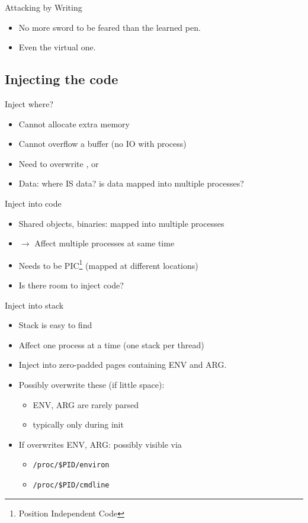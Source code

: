 \documentclass{beamer}
\newenvironment{itemizeframe}[1]
  {\begin{frame}{#1}\startitemizeframe}
  {\stopitemizeframe\end{frame}}
\newcommand\startitemizeframe{\begin{itemize}}
\newcommand\stopitemizeframe{\end{itemize}}
\begin{document}
	\begin{itemizeframe}{Attacking by Writing}
		\item No more sword to be feared than the learned pen.
		\item Even the virtual one.
	\end{itemizeframe}

	\subsection{Injecting the code}

		\begin{itemizeframe}{Inject where?}
			\item Cannot allocate extra memory
			\item Cannot overflow a buffer (no IO with process)
			\item Need to overwrite ,  or 
			\item Data: where IS data? is data mapped into multiple processes?
		\end{itemizeframe}
			
		\begin{itemizeframe}{Inject into code}
			\item Shared objects, binaries: mapped into multiple processes
			\item $\rightarrow$ Affect multiple processes at same time
			\item Needs to be PIC\footnote{Position Independent Code} (mapped at different locations)
			\item Is there room to inject code?
		\end{itemizeframe}

		\begin{itemizeframe}{Inject into stack}
			\item Stack is easy to find
			\item Affect one process at a time (one stack per thread)
			\item Inject into zero-padded pages containing ENV and ARG.
			\item Possibly overwrite these (if little space):
			\begin{itemize}
				\item ENV, ARG are rarely parsed
				\item typically only during init
			\end{itemize}
			\item If overwrites ENV, ARG: possibly visible via
			\begin{itemize}
				\item \texttt{/proc/\$PID/environ}
				\item \texttt{/proc/\$PID/cmdline}
			\end{itemize}
		\end{itemizeframe}
\end{document}
